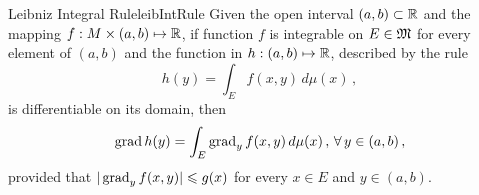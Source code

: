 \begin{mcoro}{Leibniz Integral Rule}{leibIntRule}
Given the open interval $(a,b)\subset\mathbb{R}$ and the mapping $f : M\times(a,b) \mapsto \mathbb{R}$, if function $f$ is integrable on $E\in\mathfrak{M}$ for every element of $(a,b)$ and the function in $h : (a,b) \mapsto \mathbb{R}$, described by the rule  
\begin{equation*}
h(y) = \int_E f(x,y)\, d\mu(x)\,,
\end{equation*}
is differentiable on its domain, then 
\begin{equation*}
 \operatorname{grad}{h}(y) =  \int_E \operatorname{grad}_{y}{f}(x,y)\, d\mu(x)\,,\,\forall \, y\in(a,b)\,,
\end{equation*}
provided that $|\operatorname{grad}_{y}{f}(x,y)|\leqslant g(x)$ for every $x\in E$ and  $y\in(a,b)$.
\end{mcoro}



